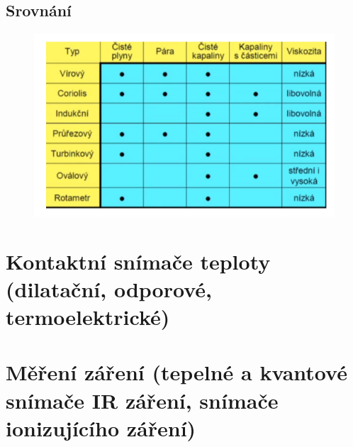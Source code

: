 \subsection*{Srovnání}

\begin{figure}[h]
    \centering
    \includegraphics[scale = 1]{img/srovnaniprutok.png}
\end{figure}

\section{Kontaktní snímače teploty (dilatační, odporové, termoelektrické)}


\section{Měření záření (tepelné a kvantové snímače IR záření, snímače ionizujícího záření)}


